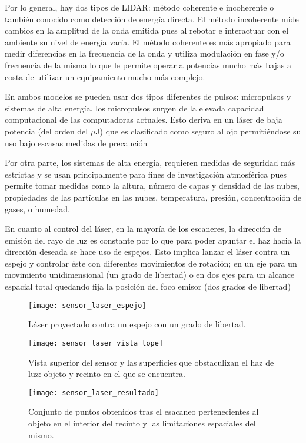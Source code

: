 Por lo general, hay dos tipos de LIDAR:
método coherente e incoherente o también conocido como detección de energía directa.
El método incoherente mide cambios en la amplitud de la onda emitida pues al rebotar e interactuar con el ambiente su nivel de energía varía.
El método coherente es más apropiado para medir diferencias en la frecuencia de la onda y utiliza modulación en fase y/o frecuencia de la misma lo que le permite operar a potencias mucho más bajas a costa de utilizar un equipamiento mucho más complejo.


En ambos modelos se pueden usar dos tipos diferentes de pulsos: micropulsos y sistemas de alta energía.
los micropulsos surgen de la elevada capacidad computacional de las computadoras actuales. Esto deriva en un láser de baja potencia (del orden del $\mu$J) que es clasificado como seguro al ojo permitiéndose su uso bajo escasas medidas de precaución 

Por otra parte, los sistemas de alta energía, requieren medidas de seguridad más estrictas y se usan principalmente para fines de investigación atmosférica pues permite tomar medidas como la altura, número de capas y densidad de las nubes, propiedades de las partículas en las nubes, temperatura, presión, concentración de gases, o humedad.

En cuanto al control del láser\cite{control_laser}, en la mayoría de los escaneres, la dirección de emisión del rayo de luz es constante por lo que para poder apuntar el haz hacia la dirección deseada se hace uso de espejos. Esto implica lanzar el láser contra un espejo y controlar éste con diferentes movimientos de rotación; en un eje para un movimiento unidimensional (un grado de libertad) o en dos ejes para un alcance espacial total quedando fija la posición del foco emisor (dos grados de libertad)

\begin{figure}[!htb]
  \texttt{[image: sensor\_laser\_espejo]}
  \caption{Láser proyectado contra un espejo con un grado de libertad.}\label{fig:sensor laser completo - espejo}
\endminipage\hfill
{}
  \texttt{[image: sensor\_laser\_vista\_tope]}
  \caption{Vista superior del sensor y las superficies que obstaculizan el haz de luz: objeto y recinto en el que se encuentra.}\label{fig:sensor laser completo - vista tope}
\endminipage\hfill
{}
  \texttt{[image: sensor\_laser\_resultado]}
  \caption{Conjunto de puntos obtenidos tras el esacaneo pertenecientes al objeto en el interior del recinto y las limitaciones espaciales del mismo.}\label{fig:sensor laser completo - resultado}
\endminipage
\end{figure}

